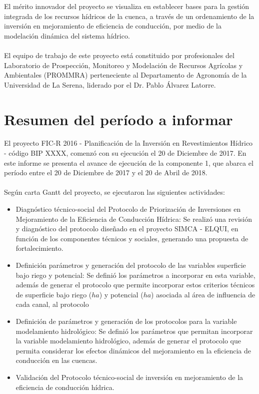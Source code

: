 \documentclass[]{article}
\begin{document}
El mérito innovador del proyecto se visualiza en establecer bases para la gestión integrada de los recursos hídricos de la cuenca, a través de un ordenamiento de la inversión en mejoramiento de eficiencia de conducción, por medio de la modelación dinámica del sistema hídrico.\\
\\
El equipo de trabajo de este proyecto está constituido por profesionales del Laboratorio de Prospección, Monitoreo y Modelación de Recursos Agrícolas y Ambientales (PROMMRA) perteneciente al Departamento de Agronomía de la Universidad de La Serena, liderado por el Dr. Pablo Álvarez Latorre.\\
\clearpage

\section{Resumen del período a informar}

El proyecto FIC-R 2016 - Planificación de la Inversión en Revestimientos Hídrico - código BIP XXXX, comenzó con su ejecución el 20 de Diciembre de 2017. En este informe se presenta el avance de ejecución de la componente 1, que abarca el período entre el 20 de Diciembre de 2017 y el 20 de Abril de 2018.\\
\\
Según carta Gantt del proyecto, se ejecutaron las siguientes actividades:
\begin{itemize}
\item Diagnóstico técnico-social del Protocolo de Priorización de Inversiones en Mejoramiento de la Eficiencia de Conducción Hídrica: Se realizó una revisión y diagnóstico del protocolo diseñado en el proyecto SIMCA - ELQUI, en función de los componentes técnicos y sociales, generando una propuesta de fortalecimiento.
\item Definición parámetros y generación del protocolo de las variables superficie bajo riego y potencial: Se definió los parámetros a incorporar en esta variable, además de generar el protocolo que permite incorporar estos criterios técnicos de superficie bajo riego ($ha$) y potencial ($ha$) asociada al área de influencia de cada canal, al protocolo 
\item Definición de parámetros y generación de los protocolos para la variable modelamiento hidrológico: Se definió los parámetros que permitan incorporar la variable modelamiento hidrológico, además de generar el protocolo que permita considerar los efectos dinámicos del mejoramiento en la eficiencia de conducción en las cuencas.
\item Validación del Protocolo técnico-social de inversión en mejoramiento de la eficiencia de conducción hídrica.
\end{itemize}
\end{document}
